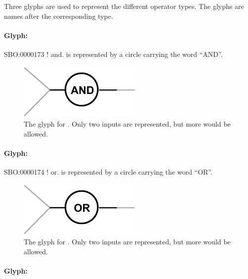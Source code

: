 Three glyphs are used to represent the different operator types. The
glyphs are names after the corresponding type.

\paragraph{Glyph: }\label{sec:techref:and}

\begin{glyphDescription}
 \glyphSboTerm SBO:0000173 ! and.
 \glyphNode {} is represented by a circle carrying the word ``AND''.
\end{glyphDescription}

\begin{figure}[htb]
  \centering
  \includegraphics[scale = 0.5]{images/and}
  \caption{The \PD glyph for . Only two inputs are represented, but more would be allowed.}
  \label{fig:techref:and}
\end{figure}


\paragraph{Glyph: }\label{sec:techref:or}

\begin{glyphDescription}
 \glyphSboTerm SBO:0000174 ! or.
 \glyphNode {} is represented by a circle carrying the word ``OR''.
 \end{glyphDescription}

\begin{figure}[htb]
  \centering
  \includegraphics[scale = 0.5]{images/or}
  \caption{The \PD glyph for . Only two inputs are represented, but more would be allowed.}
  \label{fig:techref:or}
\end{figure}


\paragraph{Glyph: }\label{sec:techref:not}

